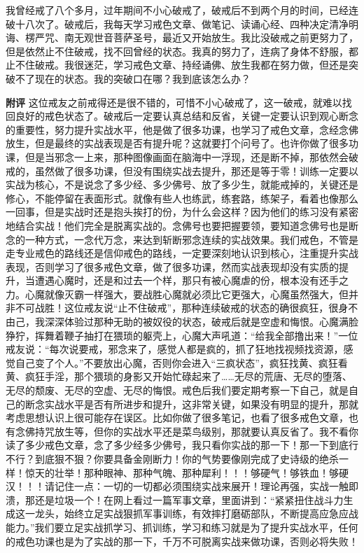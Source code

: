 \begin{case}
    我曾经戒了八个多月，过年期间不小心破戒了，破戒后不到两个月的时间，已经连破十八次了。破戒后，我每天学习戒色文章、做笔记、读诵心经、四种决定清净明诲、楞严咒、南无观世音菩萨圣号，最近又开始放生。我比没破戒之前更努力了，但是依然止不住破戒，找不回曾经的状态。我真的努力了，连病了身体不舒服，都止不住破戒。我很迷茫，学习戒色文章、持经诵佛、放生我都在努力做，但还是突破不了现在的状态。我的突破口在哪？我到底该怎么办？

    \textbf{附评} 这位戒友之前戒得还是很不错的，可惜不小心破戒了，这一破戒，就难以找回良好的戒色状态了。破戒后一定要认真总结和反省，关键一定要认识到观心断念的重要性，努力提升实战水平，他是做了很多功课，也学习了戒色文章，念经念佛放生，但是最终的实战表现是否有提升呢？这就要打个问号了。也许你做了很多功课，但是当邪念一上来，那种图像画面在脑海中一浮现，还是断不掉，那依然会破戒的，虽然做了很多功课，但没有围绕实战去提升，那还是等于零！训练一定要以实战为核心，不是说念了多少经、多少佛号、放了多少生，就能戒掉的，关键还是修心，不能停留在表面形式。就像有些人也练武，练套路，练架子，看着也像那么一回事，但是实战时还是抱头挨打的份，为什么会这样？因为他们的练习没有紧密地结合实战！他们完全是脱离实战的。念佛号也要把握要领，要知道念佛号也是断念的一种方式，一念代万念，来达到斩断邪念连续的实战效果。我们戒色，不管是走专业戒色的路线还是信仰戒色的路线，一定要深刻地认识到核心，注重提升实战表现，否则学习了很多戒色文章，做了很多功课，然而实战表现却没有实质的提升，当遭遇心魔时，还是和过去一个样，那只有被心魔虐的份，根本没有还手之力。心魔就像灭霸一样强大，要战胜心魔就必须比它更强大，心魔虽然强大，但并非不可战胜！这位戒友说“止不住破戒”，那种连续破戒的状态的确很疯狂，很身不由己，我深深体验过那种无助的被奴役的状态，破戒后就是空虚和悔恨。心魔满脸狰狞，挥舞着鞭子抽打在猥琐的躯壳上，心魔大声吼道：“给我全部撸出来！”一位戒友说：“每次说要戒，邪念来了，感觉人都是疯的，抓了狂地找视频找资源，感觉自己变了个人。”不要放出心魔，否则你会进入“三疯状态”，疯狂找黄、疯狂看黄、疯狂手淫，那个猥琐的身影又开始忙碌起来了……无尽的荒唐、无尽的堕落、无尽的颓废、无尽的空虚、无尽的悔恨。戒色后我们要定期考察一下自己，就是自己的断念实战水平是否有所进步和提升，这非常关键，如果没有明显的提升，那就考虑思想认识上很可能存在误区。比如你做了很多笔记，也看了很多戒色文章，也有念佛持咒放生等，但你的实战水平还是菜鸟级别，那就要认真反省了。我不看你读了多少戒色文章，念了多少经多少佛号，我只看你实战的那一下！那一下到底行不行？到底狠不狠？你要具备金刚断力！你的气势要像刚完成了史诗级的绝杀一样！惊天的壮举！那种眼神、那种气魄、那种犀利！！！够硬气！够铁血！够硬汉！！！请记住一点：一切的一切都必须围绕实战来展开！理论再强，实战一触即溃，那还是垃圾一个！在网上看过一篇军事文章，里面讲到：“紧紧扭住战斗力生成这一龙头，始终立足实战狠抓军事训练，有效摔打磨砺部队，不断提高应急应战能力。”我们要立足实战抓学习、抓训练，学习和练习就是为了提升实战水平，任何的戒色功课也是为了实战的那一下，千万不可脱离实战来做功课，否则必将失败！
\end{case}

